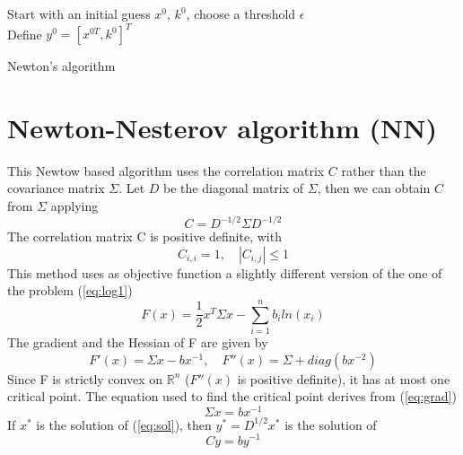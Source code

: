 \begin{algorithm}
Start with an initial guess $x^{0}$, $k^{0}$, choose a threshold $\epsilon$\\

Define $y^{0} = [x^{0T}, k^{0}]^T$\\

\caption{Newton's algorithm}
\label{alg:newton}
\end{algorithm}


\section{Newton-Nesterov algorithm (NN)}
This Newtow based algorithm uses the correlation matrix $C$ rather than the covariance matrix $\Sigma$. Let $D$ be the diagonal matrix of $\Sigma$, then we can obtain $C$ from $\Sigma$ applying
\begin{equation}
C = D^{-1/2}\Sigma D^{-1/2}
\end{equation}
The correlation matrix C is positive definite, with
\begin{equation}\label{eq:corr}
C_{i,i} = 1, \quad |C_{i,j}| \leq 1 
\end{equation}
This method uses as objective function a slightly different version of the one of the problem (\ref{eq:log1})
\begin{equation}
F(x) = \frac{1}{2} x^T \Sigma x - \sum_{i=1}^n b_i ln(x_i)
\end{equation}
The gradient and the Hessian of F are given by
\begin{equation}\label{eq:grad}
F'(x) = \Sigma x - bx^{-1}, \quad F''(x) = \Sigma + diag(bx^{-2})
\end{equation}
Since F is strictly convex on $\mathbb{R}^n$ ($F''(x)$ is positive definite), it has at most one critical point. The equation used to find the critical point derives from (\ref{eq:grad})
\begin{equation}\label{eq:sol}
\Sigma x = bx^{-1}
\end{equation}
If $x^*$ is the solution of (\ref{eq:sol}), then $y^* = D^{1/2}x^*$ is the solution of
\begin{equation}
Cy = by^{-1}
\end{equation}
